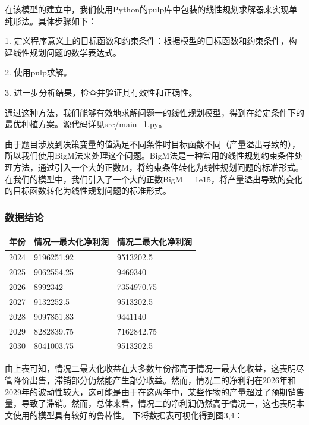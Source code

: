 \documentclass{cumcmthesis}
\begin{document}
在该模型的建立中，我们使用Python的pulp库中包装的线性规划求解器来实现单纯形法。具体步骤如下：

1. 定义程序意义上的目标函数和约束条件：根据模型的目标函数和约束条件，构建线性规划问题的数学表达式。

2. 使用pulp求解。

3. 进一步分析结果，检查并验证其有效性和正确性。

通过这种方法，我们能够有效地求解问题一的线性规划模型，得到在给定条件下的最优种植方案。源代码详见src/main\_1.py。

由于题目涉及到决策变量的值满足不同条件时目标函数不同（产量溢出导致的），所以我们使用BigM法来处理这个问题。BigM法是一种常用的线性规划约束条件处理方法，通过引入一个大的正数M，将约束条件转化为线性规划问题的标准形式。在我们的模型中，我们引入了一个大的正数BigM = 1e15，将产量溢出导致的变化的目标函数转化为线性规划问题的标准形式。

\subsubsection{数据结论}

\begin{table}[H]
    \centering
    \begin{tabular}{|l|l|l|}
    \hline
    \textbf{年份} & \textbf{情况一最大化净利润} & \textbf{情况二最大化净利润}  \\ \hline
        2024 & 9196251.92 & 9513202.5
        \\ \hline
        2025 & 9062554.25 & 9469340
        \\ \hline
        2026 & 8992342 & 7354970.75
        \\ \hline
        2027 & 9132252.5 & 9513202.5
        \\ \hline
        2028 & 9097851.83 & 9441140
        \\ \hline
        2029 & 8282839.75 & 7162842.75
        \\ \hline
        2030 & 8041003.75 & 9513202.5
        \\ \hline


    \end{tabular}
\end{table}
由上表可知，情况二最大化收益在大多数年份都高于情况一最大化收益，这表明尽管降价出售，滞销部分仍然能产生部分收益。然而，情况二的净利润在2026年和2029年的波动性较大，这可能是由于在这两年中，某些作物的产量超过了预期销售量，导致了滞销。然而，总体来看，情况二的净利润仍然高于情况一，这也表明本文使用的模型具有较好的鲁棒性。
下将数据表可视化得到图3,4：
\end{document}
